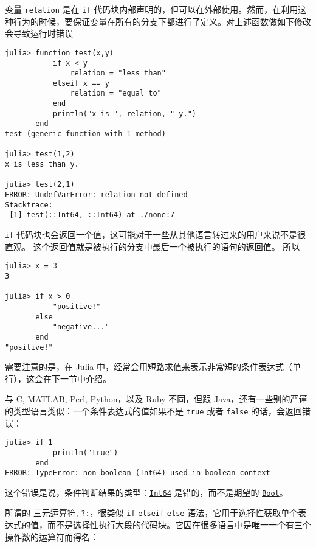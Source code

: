变量 \texttt{relation} 是在 \texttt{if} 代码块内部声明的，但可以在外部使用。然而，在利用这种行为的时候，要保证变量在所有的分支下都进行了定义。对上述函数做如下修改会导致运行时错误




\begin{verbatim}
julia> function test(x,y)
           if x < y
               relation = "less than"
           elseif x == y
               relation = "equal to"
           end
           println("x is ", relation, " y.")
       end
test (generic function with 1 method)

julia> test(1,2)
x is less than y.

julia> test(2,1)
ERROR: UndefVarError: relation not defined
Stacktrace:
 [1] test(::Int64, ::Int64) at ./none:7
\end{verbatim}



\texttt{if} 代码块也会返回一个值，这可能对于一些从其他语言转过来的用户来说不是很直观。 这个返回值就是被执行的分支中最后一个被执行的语句的返回值。 所以




\begin{verbatim}
julia> x = 3
3

julia> if x > 0
           "positive!"
       else
           "negative..."
       end
"positive!"
\end{verbatim}



需要注意的是，在 Julia 中，经常会用短路求值来表示非常短的条件表达式（单行），这会在下一节中介绍。



与 C, MATLAB, Perl, Python，以及 Ruby 不同，但跟 Java，还有一些别的严谨的类型语言类似：一个条件表达式的值如果不是 \texttt{true} 或者 \texttt{false} 的话，会返回错误：




\begin{verbatim}
julia> if 1
           println("true")
       end
ERROR: TypeError: non-boolean (Int64) used in boolean context
\end{verbatim}



这个错误是说，条件判断结果的类型：\hyperlink{7720564657383125058}{\texttt{Int64}} 是错的，而不是期望的 \hyperlink{46725311238864537}{\texttt{Bool}}。



所谓的 {\textquotedbl}三元运算符{\textquotedbl}, \texttt{?:}，很类似 \texttt{if}-\texttt{elseif}-\texttt{else} 语法，它用于选择性获取单个表达式的值，而不是选择性执行大段的代码块。它因在很多语言中是唯一一个有三个操作数的运算符而得名：




